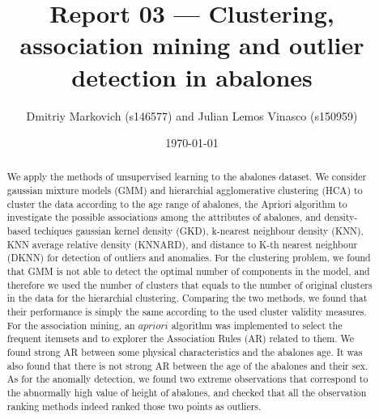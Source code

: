 \documentclass[10pt, paper=a4]{article}
\begin{document}
\title{Report 03 --- Clustering, association mining and outlier detection in
  abalones}

\author{Dmitriy Markovich (s146577) and Julian Lemos Vinasco (s150959)}

\date{\today}

\maketitle

\begin{abstract}

  We apply the methods of unsupervised learning to the abalones dataset.  We
  consider gaussian mixture models (GMM) and hierarchial agglomerative
  clustering (HCA) to cluster the data according to the age range of abalones,
  the Apriori algorithm to investigate the possible associations among the
  attributes of abalones, and density-based techiques gaussian kernel density
  (GKD), k-nearest neighbour density (KNN), KNN average relative density
  (KNNARD), and distance to K-th nearest neighbour (DKNN) for detection of
  outliers and anomalies.  For the clustering problem, we found that GMM is not
  able to detect the optimal number of components in the model, and therefore we
  used the number of clusters that equals to the number of original clusters in
  the data for the hierarchial clustering.  Comparing the two methods, we found
  that their performance is simply the same according to the used cluster
  validity measures.  For the association mining, an $apriori$ algorithm was implemented 
  to select the frequent itemsets and to explorer the Association Rules (AR) related to them. 
  We found strong AR between some physical characteristics and the abalones age. 
  It was also found that there is not strong AR between the age of the abalones and 
  their sex. As for the anomally detection, we found two extreme observations
  that correspond to the abnormally high value of height of abalones, and
  checked that all the observation ranking methods indeed ranked those two
  points as outliers.
\end{abstract}

\end{document}

